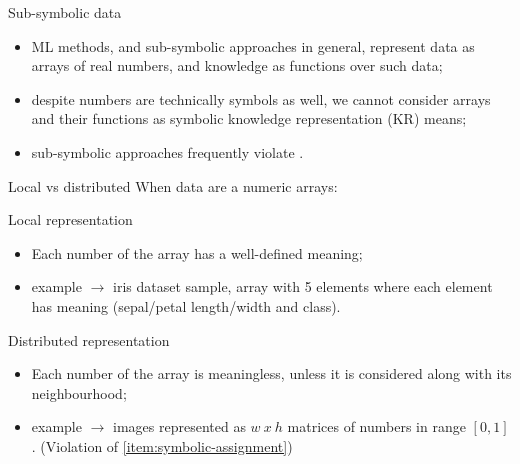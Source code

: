 \documentclass[presentation]{beamer}\mode<presentation>{\usetheme{AMSBolognaFC}}
\begin{document}
\begin{frame}[c]{Sub-symbolic data}
    \begin{itemize}
        \item ML methods, and sub-symbolic approaches in general, represent data as arrays of real numbers, and knowledge as functions over such data;
        \item despite numbers are technically symbols as well, we cannot consider arrays and their functions as symbolic knowledge representation (KR) means;
        \item sub-symbolic approaches frequently violate .
    \end{itemize}
\end{frame}

\begin{frame}[c]{Local vs distributed}
    When data are a numeric arrays:
    \begin{block}{Local representation}
        \begin{itemize}
            \item Each number of the array has a well-defined meaning;
            \item example $\rightarrow$ iris dataset sample, array with 5 elements where each element has meaning (sepal/petal length/width and class).
        \end{itemize}    
    \end{block}
    
    \begin{block}{Distributed representation}
        \begin{itemize}
            \item Each number of the array is meaningless, unless it is considered along with its neighbourhood;
            \item example $\rightarrow$ images represented as $w\ x\ h$ matrices of numbers in range $[0,1]$.
            (Violation of \cref{item:symbolic-assignment})
        \end{itemize}
    \end{block}

\end{frame}
\end{document}
